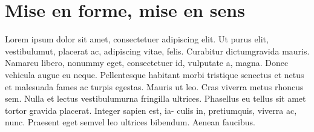 \documentclass{book}
\begin{document}

\chapter{Mise en forme, mise en sens}

Lorem ipsum dolor sit amet, consectetuer adipiscing elit. Ut purus elit,
vestibulumut, placerat ac, adipiscing vitae, felis. Curabitur dictumgravida
mauris. Namarcu libero, nonummy eget, consectetuer id, vulputate a, magna. 
Donec vehicula augue eu neque. Pellentesque habitant morbi tristique
senectus et netus et malesuada fames ac turpis egestas. Mauris ut leo. Cras
viverra metus rhoncus sem. Nulla et lectus vestibulumurna fringilla ultrices.
Phasellus eu tellus sit amet tortor gravida placerat. Integer sapien est, ia-
culis in, pretiumquis, viverra ac, nunc. Praesent eget semvel leo ultrices
bibendum. Aenean faucibus.
\end{document}
